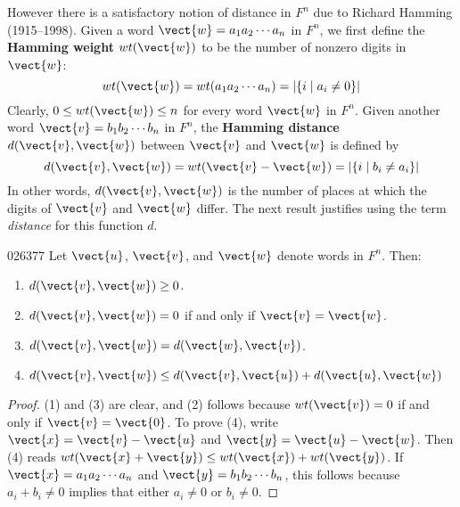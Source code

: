 However there is a satisfactory notion of distance in $F^{n}$ due to Richard Hamming (1915--1998). Given a word $\vect{w} = a_{1}a_{2}\cdots a_{n}$ in $F^{n}$, we first define the \textbf{Hamming weight} $wt(\vect{w})$ to be the number of nonzero digits in $\vect{w}$:
\begin{equation*}
wt(\vect{w}) = wt(a_{1}a_{2} \cdots a_{n}) = |\{i \mid a_{i} \neq 0\}|
\end{equation*}
Clearly, $0 \leq wt(\vect{w}) \leq n$ for every word $\vect{w}$ in $F^{n}$. Given another word $\vect{v} = b_{1}b_{2} \cdots b_{n}$ in $F^{n}$, the \textbf{Hamming distance} $d(\vect{v}, \vect{w})$ between $\vect{v}$ and $\vect{w}$ is defined by
\begin{equation*}
d(\vect{v}, \vect{w}) = wt(\vect{v} - \vect{w}) = |\{i \mid b_{i} \neq a_{i}\}|
\end{equation*}
In other words, $d(\vect{v}, \vect{w})$ is the number of places at which the digits of $\vect{v}$ and $\vect{w}$ differ. The next result justifies using the term \textit{distance} for this function $d$.

\begin{theorem}{}{026377}
Let $\vect{u}$, $\vect{v}$, and $\vect{w}$ denote words in $F^{n}$. Then:

\begin{enumerate}
\item $d(\vect{v}, \vect{w}) \geq 0$.

\item $d(\vect{v}, \vect{w}) = 0$ if and only if $\vect{v} = \vect{w}$.

\item $d(\vect{v}, \vect{w}) = d(\vect{w}, \vect{v})$.

\item $d(\vect{v}, \vect{w}) \leq d(\vect{v}, \vect{u}) + d(\vect{u}, \vect{w})$

\end{enumerate}
\end{theorem}

\begin{proof}
(1) and (3) are clear, and (2) follows because $wt(\vect{v}) = 0$ if and only if $\vect{v} = \vect{0}$. To prove (4), write $\vect{x} = \vect{v} - \vect{u}$ and $\vect{y} = \vect{u} - \vect{w}$. Then (4) reads $wt(\vect{x} + \vect{y}) \leq wt(\vect{x}) + wt(\vect{y})$. If $\vect{x} = a_{1}a_{2} \cdots a_{n}$ and $\vect{y} = b_{1}b_{2} \cdots b_{n}$, this follows because $a_{i} + b_{i} \neq 0$ implies that either $a_{i} \neq 0$ or $b_{i} \neq 0$.
\end{proof}

